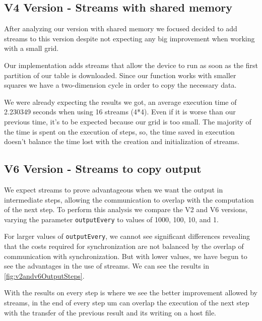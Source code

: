 \documentclass[conference]{IEEEtran}
\begin{document}
\subsection{V4 Version - Streams with shared memory}
After analyzing our version with shared memory we focused decided to add streams to this version despite not expecting any big improvement when working with a small grid.

Our implementation adds streams that allow the device to run as soon as the first partition of our table is downloaded. Since our function works with smaller squares we have a two-dimension cycle in order to copy the necessary data.

We were already expecting the results we got, an average execution time of 2.230349 seconds when using 16 streams (4*4). Even if it is worse than our previous time, it's to be expected because our grid is too small. The majority of the time is spent on the execution of steps, so, the time saved in execution doesn't balance the time lost with the creation and initialization of streams.




\subsection{V6 Version - Streams to copy output}


We expect streams to prove advantageous when we want the output in intermediate steps, allowing the communication to overlap with the computation of the next step. To perform this analysis we compare the V2 and V6 versions, varying the parameter \texttt{outputEvery} to values of 1000, 100, 10, and 1.

For larger values of \texttt{outputEvery}, we cannot see significant differences revealing that the costs required for synchronization are not balanced by the overlap of communication with synchronization. But with lower values, we have begun to see the advantages in the use of streams. We can see the results in \autoref{fig:v2andv6OutputSteps}.

With the results on every step is where we see the better improvement allowed by streams, in the end of every step um can overlap the execution of the next step with the transfer of the previous result and its writing on a host file.
\end{document}
